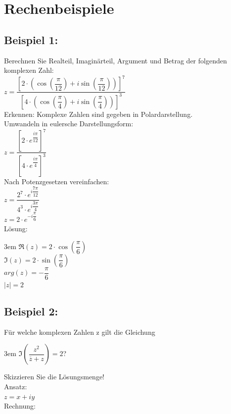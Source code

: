 \documentclass[11pt,final]{scrreprt}
\newcommand{\br} {\medskip\\}
\newcommand{\gbr} {\bigskip\\}
\begin{document}
\section{Rechenbeispiele}

\subsection*{Beispiel 1:}

Berechnen Sie Realteil, Imaginärteil, Argument und Betrag der folgenden komplexen Zahl:\\
\hspace*{3em} $ z = \dfrac{\left[  2\cdot (\cos(\dfrac{\pi}{12})+i\sin(\dfrac{\pi}{12}))\right]^7}{\left[  4\cdot (\cos(\dfrac{\pi}{4})+i\sin(\dfrac{\pi}{4}))\right]^3} $\br
Erkennen: Komplexe Zahlen sind gegeben in Polardarstellung.\\
Umwandeln in eulersche Darstellungsform:\\
\hspace*{3em} $ z = \dfrac{\left[  2\cdot e^{\dfrac{i\pi}{12}}\right]^7}{\left[  4\cdot e^{\dfrac{i\pi}{4}}\right]^3} $\br
Nach Potenzgesetzen vereinfachen:\\
\hspace*{3em} $ z = \dfrac{  2^7\cdot e^{i\dfrac{7\pi}{12}}}{4^3\cdot e^{i\dfrac{3\pi}{4}}} $\\
\hspace*{3em} $ z =  2\cdot e^{-i\dfrac{\pi}{6}} $\gbr
Lösung:

\begingroup
\leftskip3em 
$ \Re(z) = 2\cdot\cos(\dfrac{\pi}{6}) $\\
$ \Im(z) = 2\cdot\sin(\dfrac{\pi}{6}) $\\
$ arg(z) = -\dfrac{\pi}{6} $\\
$ | z |  = 2 $
\par	
\endgroup 


\subsection*{Beispiel 2:}
Für welche komplexen Zahlen z gilt die Gleichung

\begingroup
\leftskip3em 
$ \Im\left( \dfrac{z^2}{\overline{z}+z} \right) = 2 $?
\par	
\endgroup 
Skizzieren Sie die Lösungsmenge!\br
Ansatz:\\
\hspace*{3em}$z=x+iy$\br
Rechnung:
\end{document}
